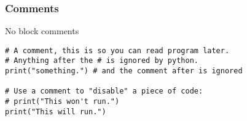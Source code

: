 \begin{frame}[fragile] \frametitle{Comments}
No block comments
\begin{lstlisting}
# A comment, this is so you can read program later.
# Anything after the # is ignored by python.
print("something.") # and the comment after is ignored

# Use a comment to "disable" a piece of code:
# print("This won't run.")
print("This will run.")
\end{lstlisting}

\end{frame}








    
